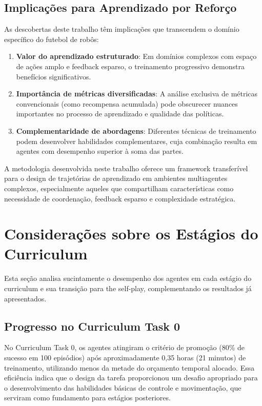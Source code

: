\subsection{Implicações para Aprendizado por Reforço}

As descobertas deste trabalho têm implicações que transcendem o domínio específico do futebol de robôs:

\begin{enumerate}
    \item \textbf{Valor do aprendizado estruturado}: Em domínios complexos com espaço de ações amplo e feedback esparso, o treinamento progressivo demonstra benefícios significativos.
    
    \item \textbf{Importância de métricas diversificadas}: A análise exclusiva de métricas convencionais (como recompensa acumulada) pode obscurecer nuances importantes no processo de aprendizado e qualidade das políticas.
    
    \item \textbf{Complementaridade de abordagens}: Diferentes técnicas de treinamento podem desenvolver habilidades complementares, cuja combinação resulta em agentes com desempenho superior à soma das partes.
\end{enumerate}

A metodologia desenvolvida neste trabalho oferece um framework transferível para o design de trajetórias de aprendizado em ambientes multiagentes complexos, especialmente aqueles que compartilham características como necessidade de coordenação, feedback esparso e complexidade estratégica.

\section{Considerações sobre os Estágios do Curriculum}
\label{sec:analise_estagios}

Esta seção analisa sucintamente o desempenho dos agentes em cada estágio do curriculum e sua transição para the self-play, complementando os resultados já apresentados.

\subsection{Progresso no Curriculum Task 0}

No Curriculum Task 0, os agentes atingiram o critério de promoção (80\% de sucesso em 100 episódios) após aproximadamente 0,35 horas (21 minutos) de treinamento, utilizando menos da metade do orçamento temporal alocado. Essa eficiência indica que o design da tarefa proporcionou um desafio apropriado para o desenvolvimento das habilidades básicas de controle e movimentação, que serviram como fundamento para estágios posteriores.

